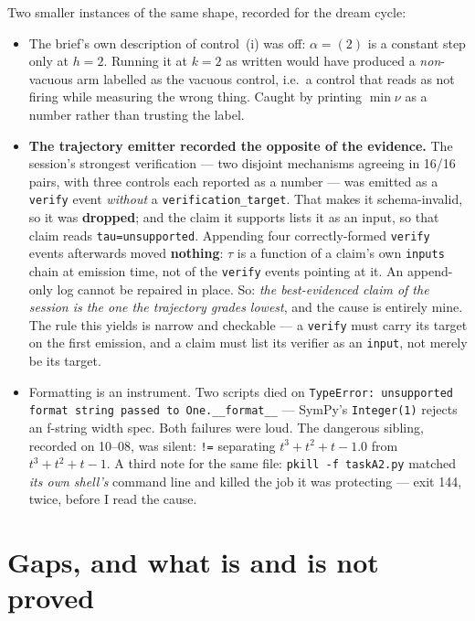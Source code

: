 \documentclass[11pt]{article}
\theoremstyle{definition}
\begin{document}
Two smaller instances of the same shape, recorded for the dream cycle:
\begin{itemize}
\item The brief's own description of control~(i) was off: $\alpha=(2)$ is a constant
  step only at $h=2$.  Running it at $k=2$ as written would have produced a
  \emph{non}-vacuous arm labelled as the vacuous control, i.e.\ a control that reads as
  not firing while measuring the wrong thing.  Caught by printing $\min\nu$ as a number
  rather than trusting the label.
\item \textbf{The trajectory emitter recorded the opposite of the evidence.}  The session's
  strongest verification --- two disjoint mechanisms agreeing in 16/16 pairs, with three
  controls each reported as a number --- was emitted as a \texttt{verify} event
  \emph{without} a \texttt{verification\_target}.  That makes it schema-invalid, so it was
  \textbf{dropped}; and the claim it supports lists it as an input, so that claim reads
  \texttt{tau=unsupported}.  Appending four correctly-formed \texttt{verify} events afterwards
  moved \textbf{nothing}: $\tau$ is a function of a claim's own \texttt{inputs} chain at
  emission time, not of the \texttt{verify} events pointing at it.  An append-only log cannot
  be repaired in place.  So: \emph{the best-evidenced claim of the session is the one the
  trajectory grades lowest}, and the cause is entirely mine.  The rule this yields is narrow
  and checkable --- a \texttt{verify} must carry its target on the first emission, and a claim
  must list its verifier as an \texttt{input}, not merely be its target.
\item Formatting is an instrument.  Two scripts died on
  \texttt{TypeError: unsupported format string passed to One.\_\_format\_\_} --- SymPy's
  \texttt{Integer(1)} rejects an f-string width spec.  Both failures were loud.  The
  dangerous sibling, recorded on 10--08, was silent: \texttt{!=} separating
  $t^3+t^2+t-1.0$ from $t^3+t^2+t-1$.  A third note for the same file: \texttt{pkill -f
  taskA2.py} matched \emph{its own shell's} command line and killed the job it was
  protecting --- exit 144, twice, before I read the cause.
\end{itemize}

\section{Gaps, and what is and is not proved}
\end{document}

